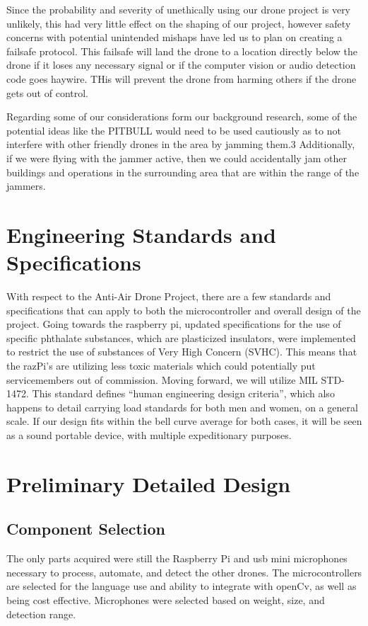 \documentclass[10pt]{article}
\begin{document}
Since the probability and severity of unethically using our drone project is very unlikely, this had very little effect on the shaping of our project, however safety concerns with potential unintended mishaps have led us to plan on creating a failsafe protocol.  This failsafe will land the drone to a location directly below the drone if it loses any necessary signal or if the computer vision or audio detection code goes haywire.  THis will prevent the drone from harming others if the drone gets out of control.  

Regarding some of our considerations form our background research, some of the potential ideas like the PITBULL would need to be used cautiously as to not interfere with other friendly drones in the area by jamming them.3  Additionally, if we were flying with the jammer active, then we could accidentally jam other buildings and operations in the surrounding area that are within the range of the jammers.

\section{Engineering Standards and Specifications}
With respect to the Anti-Air Drone Project, there are a few standards and specifications that can apply to both the microcontroller and overall design of the project. Going towards the raspberry pi, updated specifications for the use of specific phthalate substances, which are plasticized insulators, were implemented to restrict the use of substances of Very High Concern (SVHC). This means that the razPi’s are utilizing less toxic materials which could potentially put servicemembers out of commission. Moving forward, we will utilize  MIL STD-1472.  This standard defines “human engineering design criteria”, which also happens to detail carrying load standards for both men and women, on a general scale. If our design fits within the bell curve average for both cases, it will be seen as a sound portable device, with multiple expeditionary purposes.

\section{Preliminary Detailed Design}
\subsection{Component Selection}
The only parts acquired were still the Raspberry Pi and usb mini microphones necessary to process, automate, and detect the other drones. The microcontrollers are selected for the language use and ability to integrate with openCv, as well as being cost effective. Microphones were selected based on weight, size, and detection range.  
\end{document}
